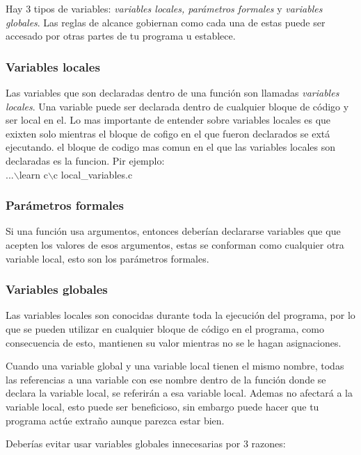 \documentclass[]{article}
\begin{document}
	Hay 3 tipos de variables: \textit{variables locales, parámetros formales} y \textit{variables globales}. Las reglas de alcance gobiernan como cada una de estas puede ser accesado por otras partes de tu programa u establece.
	
	\subsubsection{Variables locales}
	
	Las variables que son declaradas dentro de una función son llamadas \textit{variables locales}. Una variable puede ser declarada dentro de cualquier bloque de código y ser local en el. Lo mas importante de entender sobre variables locales es que exixten solo mientras el bloque de cofigo en el que fueron declarados se extá ejecutando. el bloque de codigo mas comun en el que las variables locales son declaradas es la funcion. Pir ejemplo:\\
	
	...$\backslash$learn c$\backslash$c local\_variables.c\\
	
	\subsubsection{Parámetros formales}
	
	Si una función usa argumentos, entonces deberían declararse variables que que acepten los valores de esos argumentos, estas se conforman como cualquier otra variable local, esto son los parámetros formales.
	
	\subsubsection{Variables globales}
	
	Las variables locales son conocidas durante toda la ejecución del programa, por lo que se pueden utilizar en cualquier bloque de código en el programa, como consecuencia de esto, mantienen su valor mientras no se le hagan asignaciones.
	
	Cuando una variable global y una variable local tienen el mismo nombre, todas las referencias a una variable con ese nombre dentro de la función donde se declara la variable local, se referirán a esa variable local. Ademas no afectará a la variable local, esto puede ser beneficioso, sin embargo puede hacer que tu programa actúe extraño aunque parezca estar bien.
	
	Deberías evitar usar variables globales innecesarias por 3 razones:
	
\end{document}

